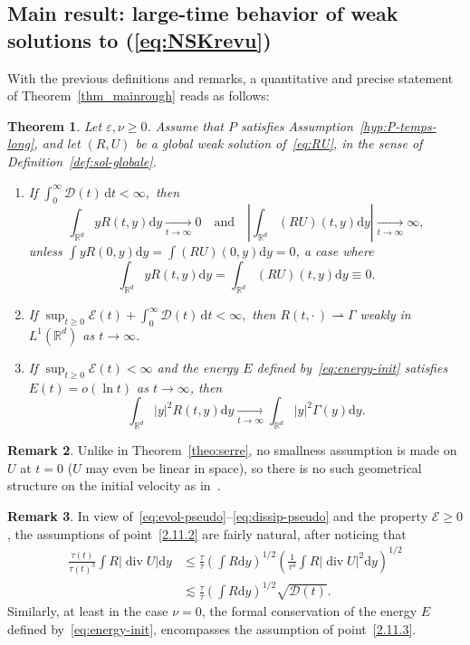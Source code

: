 \documentclass[10pt]{amsart}
\newtheorem{theo}{Theorem}[section]
\theoremstyle{definition}\newtheorem{defi}[theo]{Definition}\newtheorem{rema}[theo]{Remark}\newtheorem{exam}[theo]{Example}\newtheorem{exem}[theo]{Example}\newtheorem{nota}[theo]{Notation}
\DeclareMathOperator{\DIV}{div}
\newcommand*\R{\mathbb{R}}
\newcommand*\dd {\mathrm{d}}
\newcommand*\<{\left\langle}
\renewcommand*\>{\right\rangle}
\renewcommand*\le{\leqslant}
\renewcommand*\ge{\geqslant}
\newcommand*\Tend[2]{\mathop{\longrightarrow}\limits_{#1\rightarrow#2}}
\newcommand*\eps{\varepsilon}
\begin{document}
\subsection{Main result: large-time behavior of weak solutions to (\ref{eq:NSKrevu})}

With the previous definitions and remarks, a quantitative and precise statement of Theorem~\ref{thm_mainrough} reads as follows:

\goodbreak
\begin{theo}\label{theo:temps-long}
Let $\eps,\nu\ge 0$. Assume that $P$ satisfies Assumption~\ref{hyp:P-temps-long}, and let $(R,U)$ be a global weak solution of~\eqref{eq:RU}, in the sense of Definition~\ref{def:sol-globale}.
\begin{enumerate}%
\item \label{2.11.1} If $\int_0^\infty \mathcal D(t) \, \dd t < \infty,$ then
\[
\int_{\R^d} yR(t,y)\dd y\Tend t \infty 0\quad \text{and}\quad \left|\int_{\R^d} (RU)(t,y)\dd y\right|\Tend t \infty \infty,
\]
unless $\int y R(0,y)\dd y= \int (RU)(0,y)\dd y =0$, a case where
\[
\int_{\R^d} yR(t,y)\dd y=\int_{\R^d} (RU)(t,y)\dd y\equiv 0.
\]

\item \label{2.11.2} If $
\sup_{t \ge 0} \mathcal E(t) + \int_0^\infty \mathcal D(t) \, \dd t < \infty,$ then $R(t, \cdot\,) \rightharpoonup \Gamma$ weakly in $L^1(\R^d)$ as $ t \to \infty$.

\item \label{2.11.3} If $
\sup_{t \ge 0} \mathcal E(t) < \infty$ and the energy $E$ defined by~\eqref{eq:energy-init} satisfies $E(t)=o\left(\ln t\right)$ as $t\to \infty$, then
\begin{equation*}
\int_{\R^d}|y|^2R(t,y) \dd y \Tend t \infty \int_{\R^d}|y|^2 \Gamma(y) \dd y.
\end{equation*}
\end{enumerate}
\end{theo}

\begin{rema}
Unlike in Theorem~\ref{theo:serre}, no smallness assumption is made on $U$ at $t=0$ ($U$ may even be linear in space), so there is no such geometrical structure on the initial velocity as in~\cite{Serre97,Gra98}.
\end{rema}

\begin{rema}\label{rem:hyp-naturelles}
In view of~\eqref{eq:evol-pseudo}--\eqref{eq:dissip-pseudo} and the property $\mathcal E\ge 0$, the assumptions of point~\eqref{2.11.2} are fairly natural, after noticing that
\begin{align*}
\frac{\dot
\tau(t)}{\tau(t)^3} \int R \left| \DIV U\right|\dd y & \le
\frac{\dot \tau}{\tau}\left(\int R\dd y\right)^{1/2} \left(\frac{1}{\tau^4}\int R|\DIV U|^2\dd y\right)^{1/2}\\
&\lesssim \frac{\dot \tau}{\tau}\left(\int R\dd y\right)^{1/2} \sqrt{\mathcal D(t)}.
\end{align*}
Similarly, at least in the case $\nu=0$, the formal conservation of the energy $E$ defined by~\eqref{eq:energy-init}, encompasses the assumption of point~\eqref{2.11.3}.
\end{rema}
\end{document}
